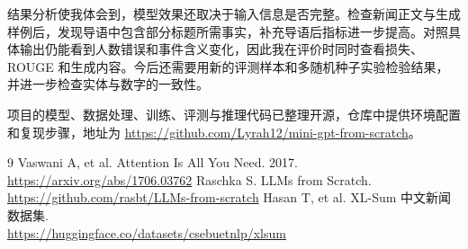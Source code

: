 \documentclass[UTF8,a4paper,12pt,fontset=fandol]{ctexart}
\begin{document}
结果分析使我体会到，模型效果还取决于输入信息是否完整。检查新闻正文与生成样例后，发现导语中包含部分标题所需事实，补充导语后指标进一步提高。对照具体输出仍能看到人数错误和事件含义变化，因此我在评价时同时查看损失、ROUGE 和生成内容。今后还需要用新的评测样本和多随机种子实验检验结果，并进一步检查实体与数字的一致性。

项目的模型、数据处理、训练、评测与推理代码已整理开源，仓库中提供环境配置和复现步骤，地址为 \url{https://github.com/Lyrah12/mini-gpt-from-scratch}。

\begin{thebibliography}{9}
 Vaswani A, et al. Attention Is All You Need. 2017.\\
\url{https://arxiv.org/abs/1706.03762}
 Raschka S. LLMs from Scratch.\\
\url{https://github.com/rasbt/LLMs-from-scratch}
 Hasan T, et al. XL-Sum 中文新闻数据集.\\
\url{https://huggingface.co/datasets/csebuetnlp/xlsum}
\end{thebibliography}
\end{document}
